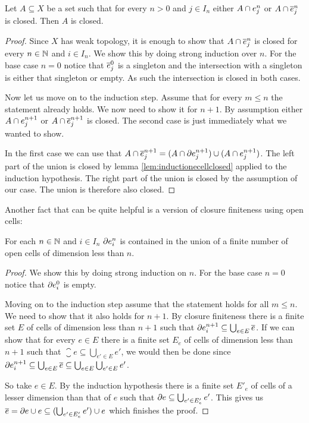 \begin{lem}
    Let $A \subseteq X$ be a set such that for every $n > 0$ and $j \in I_n$ either $A \cap \ocell{n}{j}$ or $A \cap \ccell{n}{j}$ is closed. 
    Then $A$ is closed.
\end{lem}
\begin{proof}
    Since $X$ has weak topology, it is enough to show that $A \cap \ccell{n}{j}$ is closed for every $n \in \bN$ and $i \in I_n$.
    We show this by doing strong induction over $n$.
    For the base case $n = 0$ notice that $\ccell{0}{j}$ is a singleton and the intersection with a singleton is either that singleton or empty. 
    As such the intersection is closed in both cases.

    Now let us move on to the induction step. 
    Assume that for every $m \le n$ the statement already holds. 
    We now need to show it for $n + 1$.
    By assumption either $A \cap \ocell{n + 1}{j}$ or $A \cap \ccell{n + 1}{j}$ is closed. The second case is just immediately what we wanted to show. 

    In the first case we can use that $A \cap \ccell{n + 1}{j} = (A \cap \ecell{n + 1}{j}) \cup (A \cap \ocell{n + 1}{j})$.
    The left part of the union is closed by lemma \ref{lem:inductionecellclosed} applied to the induction hypothesis. 
    The right part of the union is closed by the assumption of our case. 
    The union is therefore also closed. 
\end{proof}

Another fact that can be quite helpful is a version of closure finiteness using open cells:

\begin{lem}
    For each $n \in \bN$ and $i \in I_n$ $\ecell{n}{i}$ is contained in the union of a finite number of open cells of dimension less than $n$.
\end{lem}
\begin{proof}
    We show this by doing strong induction on $n$. 
    For the base case $n = 0$ notice that $\ecell{0}{i}$ is empty. 

    Moving on to the induction step assume that the statement holds for all $m \le n$.
    We need to show that it also holds for $n + 1$. 
    By closure finiteness there is a finite set $E$ of cells of dimension less than $n + 1$ such that $\ecell{n + 1}{i} \subseteq \bigcup_{e \in E}\closure{e}$. 
    If we can show that for every $e \in E$ there is a finite set $E_e$ of cells of dimension less than $n + 1$ such that $\closure{e} \subseteq \bigcup_{e' \in E}e'$, we would then be done since $\ecell{n + 1}{i} \subseteq \bigcup_{e \in E}\closure{e} \subseteq \bigcup_{e \in E}\bigcup_{e' \in E}e'$. 

    So take $e \in E$. 
    By the induction hypothesis there is a finite set $E'_e$ of cells of a lesser dimension than that of $e$ such that $\boundary e \subseteq \bigcup_{e' \in E'_e}e'$. 
    This gives us $\closure e = \boundary e \cup e \subseteq (\bigcup_{e' \in E'_e}e') \cup e$ which finishes the proof.
\end{proof}